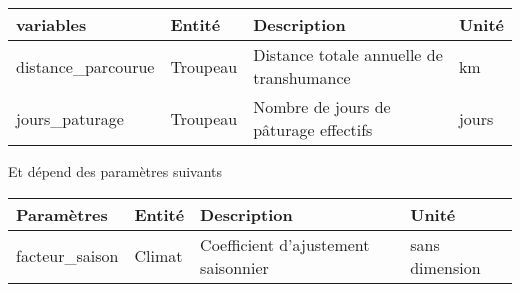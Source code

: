 \documentclass[
]{article}
\begin{document}
\begin{longtable}[]{@{}
  >{\raggedright\arraybackslash}p{}
  >{\raggedright\arraybackslash}p{}
  >{\raggedright\arraybackslash}p{}
  >{\raggedright\arraybackslash}p{}@{}}
\toprule\noalign{}
\begin{minipage}[b]{\linewidth}\raggedright
\textbf{variables}
\end{minipage} & \begin{minipage}[b]{\linewidth}\raggedright
\textbf{Entité}
\end{minipage} & \begin{minipage}[b]{\linewidth}\raggedright
\textbf{Description}
\end{minipage} & \begin{minipage}[b]{\linewidth}\raggedright
\textbf{Unité}
\end{minipage} \\
\midrule\noalign{}
\endhead
\bottomrule\noalign{}
\endlastfoot
distance\_parcourue & Troupeau & Distance totale annuelle de
transhumance & km \\
jours\_paturage & Troupeau & Nombre de jours de pâturage effectifs &
jours \\
\end{longtable}

Et dépend des paramètres suivants

\begin{longtable}[]{@{}
  >{\raggedright\arraybackslash}p{}
  >{\raggedright\arraybackslash}p{}
  >{\raggedright\arraybackslash}p{}
  >{\raggedright\arraybackslash}p{}@{}}
\toprule\noalign{}
\begin{minipage}[b]{\linewidth}\raggedright
\textbf{Paramètres}
\end{minipage} & \begin{minipage}[b]{\linewidth}\raggedright
\textbf{Entité}
\end{minipage} & \begin{minipage}[b]{\linewidth}\raggedright
\textbf{Description}
\end{minipage} & \begin{minipage}[b]{\linewidth}\raggedright
\textbf{Unité}
\end{minipage} \\
\midrule\noalign{}
\endhead
\bottomrule\noalign{}
\endlastfoot
facteur\_saison & Climat & Coefficient d'ajustement saisonnier & sans
dimension \\
\end{longtable}
\end{document}
